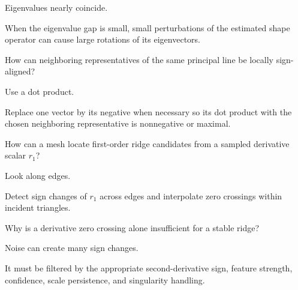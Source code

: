 \begin{hint}
Eigenvalues nearly coincide.
\end{hint}

\begin{solution}
When the eigenvalue gap is small, small perturbations of the estimated shape operator can cause large rotations of its eigenvectors.
\end{solution}

\begin{exercise}\label{exr:vii42-19}
How can neighboring representatives of the same principal line be locally sign-aligned?
\end{exercise}

\begin{hint}
Use a dot product.
\end{hint}

\begin{solution}
Replace one vector by its negative when necessary so its dot product with the chosen neighboring representative is nonnegative or maximal.
\end{solution}

\begin{exercise}\label{exr:vii42-20}
How can a mesh locate first-order ridge candidates from a sampled derivative scalar \(r_1\)?
\end{exercise}

\begin{hint}
Look along edges.
\end{hint}

\begin{solution}
Detect sign changes of \(r_1\) across edges and interpolate zero crossings within incident triangles.
\end{solution}

\begin{exercise}\label{exr:vii42-21}
Why is a derivative zero crossing alone insufficient for a stable ridge?
\end{exercise}

\begin{hint}
Noise can create many sign changes.
\end{hint}

\begin{solution}
It must be filtered by the appropriate second-derivative sign, feature strength, confidence, scale persistence, and singularity handling.
\end{solution}

